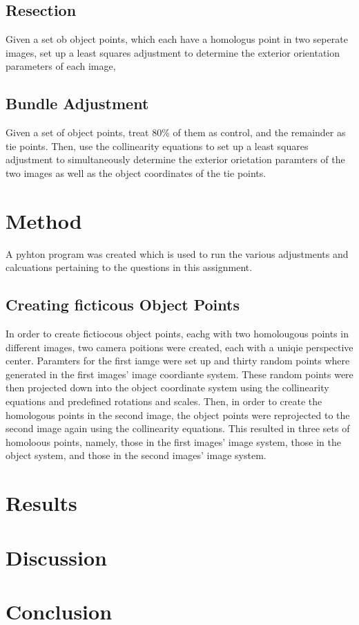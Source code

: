 \documentclass{article}
\begin{document}
\subsection{Resection}
Given a set ob object points, which each have a homologus point in two seperate images, set up a least squares adjustment 
to determine the exterior orientation parameters of each image,

\subsection{Bundle Adjustment}
Given a set of object points, treat 80\% of them as control, and the remainder as tie points. 
Then, use the collinearity equations to set up a least squares adjustment to simultaneously determine the exterior 
orietation paramters of the two images as well as the object coordinates of the tie points.


\section{Method}
A pyhton program was created which is used to run the various adjustments and calcuations pertaining to the questions 
in this assignment.

\subsection{Creating ficticous Object Points}
In order to create fictiocous object points, eachg with two homolougous points in different images, 
two camera poitions were created, each with a uniqie perspective center. 
Paramters for the first iamge were set up and thirty random points where generated in the first images' image coordiante system. 
These random points were then projected down into the object coordinate system using the collinearity equations and 
predefined rotations and scales. Then, in order to create the homologous points in the second image, the object points were 
reprojected to the second image again using the collinearity equations. 
This resulted in three sets of homoloous points, namely, those in the first images' image system, those in the object system, 
and those in the second images' image system.

\section{Results}

\section{Discussion}

\section{Conclusion}
\end{document}

